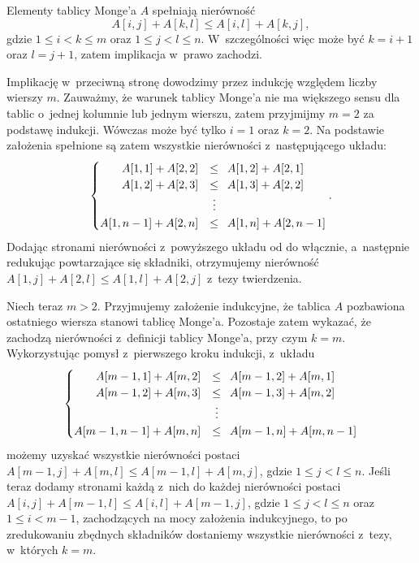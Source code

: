 
\subproblem %
Elementy tablicy Monge'a $A$ spełniają nierówność
\[
	A[i,j]+A[k,l] \le A[i,l]+A[k,j],
\]
gdzie $1\le i<k\le m$ oraz $1\le j<l\le n$. W~szczególności więc może być $k=i+1$ oraz $l=j+1$, zatem implikacja w~prawo zachodzi.

Implikację w~przeciwną stronę dowodzimy przez indukcję względem liczby wierszy $m$. Zauważmy, że warunek tablicy Monge'a nie ma większego sensu dla tablic o~jednej kolumnie lub jednym wierszu, zatem przyjmijmy $m=2$ za podstawę indukcji. Wówczas może być tylko $i=1$ oraz $k=2$. Na podstawie założenia spełnione są zatem wszystkie nierówności z~następującego układu:
\[
	\begin{cases}
		\hfill A[1,1]+A[2,2] &\le\,\,\, A[1,2]+A[2,1] \\
		\hfill A[1,2]+A[2,3] &\le\,\,\, A[1,3]+A[2,2] \\
		& \;\vdots \\
		A[1,n-1]+A[2,n] &\le\,\,\, A[1,n]+A[2,n-1] \\
	\end{cases}.
\]
Dodając stronami nierówności z~powyższego układu od  do  włącznie, a~następnie redukując powtarzające się składniki, otrzymujemy nierówność $A[1,j]+A[2,l]\le A[1,l]+A[2,j]$ z~tezy twierdzenia.

Niech teraz $m>2$. Przyjmujemy założenie indukcyjne, że tablica $A$ pozbawiona ostatniego wiersza stanowi tablicę Monge'a. Pozostaje zatem wykazać, że zachodzą nierówności z~definicji tablicy Monge'a, przy czym $k=m$. Wykorzystując pomysł z~pierwszego kroku indukcji, z~układu
\[
	\begin{cases}
		\hfill A[m-1,1]+A[m,2] &\le\,\,\, A[m-1,2]+A[m,1] \\
		\hfill A[m-1,2]+A[m,3] &\le\,\,\, A[m-1,3]+A[m,2] \\
		& \;\vdots \\
		A[m-1,n-1]+A[m,n] &\le\,\,\, A[m-1,n]+A[m,n-1] \\
	\end{cases}
\]
możemy uzyskać wszystkie nierówności postaci $A[m-1,j]+A[m,l]\le A[m-1,l]+A[m,j]$, gdzie $1\le j<l\le n$. Jeśli teraz dodamy stronami każdą z~nich do każdej nierówności postaci $A[i,j]+A[m-1,l]\le A[i,l]+A[m-1,j]$, gdzie $1\le j<l\le n$ oraz $1\le i<m-1$, zachodzących na mocy założenia indukcyjnego, to po zredukowaniu zbędnych składników dostaniemy wszystkie nierówności z~tezy, w~których $k=m$.

